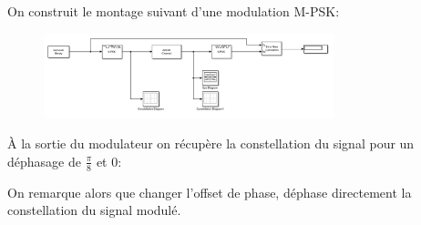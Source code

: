 \documentclass[11pt, openright]{book}
\begin{document}
On construit le montage suivant d'une modulation M-PSK:

\begin{figure}[ht!]
	\centering
	\includegraphics[width=0.75\textwidth]{./object/g10.png}
	\caption{}
\end{figure}

À la sortie du modulateur on récupère la constellation du signal pour un déphasage de $\frac{\pi}{8}$ et $0$:
\begin{figure}[ht!]
	\begin{floatrow}


	\end{floatrow}
\end{figure}

\newpage

On remarque alors que changer l'offset de phase, déphase directement la constellation du signal modulé.
\end{document}
